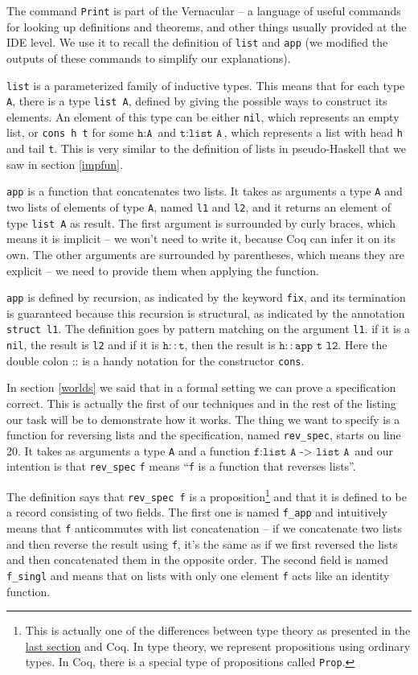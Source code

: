 \documentclass[declaration,mgr,english,shortabstract]{iithesis}
\newcommand{\m}[1]{\texttt{#1}}
\begin{document}
The command \m{Print} is part of the Vernacular -- a language of useful commands for looking up definitions and theorems, and other things usually provided at the IDE level. We use it to recall the definition of \m{list} and \m{app} (we modified the outputs of these commands to simplify our explanations).

\m{list} is a parameterized family of inductive types. This means that for each type \m{A}, there is a type \m{list A}, defined by giving the possible ways to construct its elements. An element of this type can be either \m{nil}, which represents an empty list, or \m{cons h t} for some $\m{h} : \m{A}$ and $\m{t} : \m{list A}$, which represents a list with head \m{h} and tail \m{t}. This is very similar to the definition of lists in pseudo-Haskell that we saw in section \ref{impfun}.

\m{app} is a function that concatenates two lists. It takes as arguments a type \m{A} and two lists of elements of type \m{A}, named \m{l1} and \m{l2}, and it returns an element of type \m{list A} as result. The first argument is surrounded by curly braces, which means it is implicit -- we won't need to write it, because Coq can infer it on its own. The other arguments are surrounded by parentheses, which means they are explicit -- we need to provide them when applying the function.

\m{app} is defined by recursion, as indicated by the keyword \m{fix}, and its termination is guaranteed because this recursion is structural, as indicated by the annotation \m{struct l1}. The definition goes by pattern matching on the argument \m{l1}. if it is a \m{nil}, the result is \m{l2} and if it is $\m{h} :: \m{t}$, then the result is $\m{h} :: \m{app t l2}$. Here the double colon $\m{::}$ is a handy notation for the constructor \m{cons}.

In section \ref{worlds} we said that in a formal setting we can prove a specification correct. This is actually the first of our techniques and in the rest of the listing our task will be to demonstrate how it works. The thing we want to specify is a function for reversing lists and the specification, named \m{rev\_spec}, starts on line 20. It takes as arguments a type \m{A} and a function $\m{f} : \m{list A -> list A}$ and our intention is that \m{rev\_spec} \m{f} means ``\m{f} is a function that reverses lists''.

The definition says that \m{rev\_spec f} is a proposition\footnote{This is actually one of the differences between type theory as presented in the \hyperref[mltt]{last section} and Coq. In type theory, we represent propositions using ordinary types. In Coq, there is a special type of propositions called \m{Prop}.} and that it is defined to be a record consisting of two fields. The first one is named \m{f\_app} and intuitively means that \m{f} anticommutes with list concatenation -- if we concatenate two lists and then reverse the result using \m{f}, it's the same as if we first reversed the lists and then concatenated them in the opposite order. The second field is named \m{f\_singl} and means that on lists with only one element \m{f} acts like an identity function.
\end{document}
